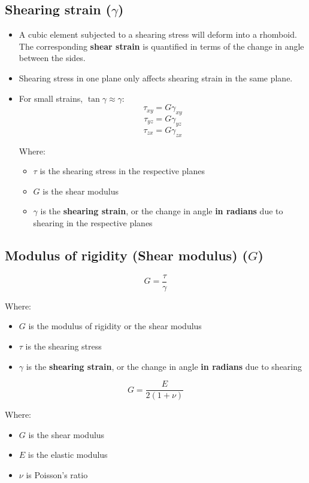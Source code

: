 \documentclass[11pt]{article}
\begin{document}
\subsection{Shearing strain (\(\gamma\))}
\label{sec:orgf3e8c24}
\begin{itemize}
\item A cubic element subjected to a shearing stress will deform into a rhomboid. The corresponding \textbf{shear strain} is quantified in terms of the change in angle between the sides.
\item Shearing stress in one plane only affects shearing strain in the same plane.
\item For small strains, \(\tan \gamma \approx \gamma\):
\[\tau_{xy} = G \gamma_{xy}\]
\[\tau_{yz} = G \gamma_{yz}\]
\[\tau_{zx} = G \gamma_{zx}\]

Where:
\begin{itemize}
\item \(\tau\) is the shearing stress in the respective planes
\item \(G\) is the shear modulus
\item \(\gamma\) is the \textbf{shearing strain}, or the change in angle \textbf{in radians} due to shearing in the respective planes
\end{itemize}
\end{itemize}

\subsection{Modulus of rigidity (Shear modulus) (\(G\))}
\label{sec:org1e98521}
\[G = \frac{\tau}{\gamma}\]

Where:
\begin{itemize}
\item \(G\) is the modulus of rigidity or the shear modulus
\item \(\tau\) is the shearing stress
\item \(\gamma\) is the \textbf{shearing strain}, or the change in angle \textbf{in radians} due to shearing
\end{itemize}

\[G = \frac{E}{2(1 + \nu)}\]

Where:
\begin{itemize}
\item \(G\) is the shear modulus
\item \(E\) is the elastic modulus
\item \(\nu\) is Poisson's ratio
\end{itemize}
\end{document}

